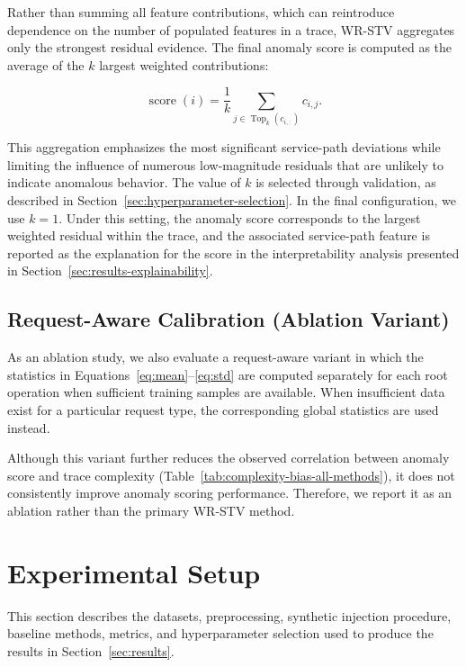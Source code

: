 \documentclass[informatics,article,submit,moreauthors]{Definitions/mdpi}
\newcommand{\rev}[1]{{\color{revisionblue}#1}}
\begin{document}
Rather than summing all feature contributions, which can reintroduce
dependence on the number of populated features in a trace, WR-STV
aggregates only the strongest residual evidence. The final anomaly score
is computed as the average of the \(k\) largest weighted contributions:

\begin{equation}
	\operatorname{score}(i)
	=
	\frac{1}{k}
	\sum_{j \in \operatorname{Top}_k(c_{i,:})}
	c_{i,j}.
	\label{eq:topk}
\end{equation}

\noindent This aggregation emphasizes the most significant service-path
deviations while limiting the influence of numerous low-magnitude
residuals that are unlikely to indicate anomalous behavior. The value of
\(k\) is selected through validation, as described in
Section~\ref{sec:hyperparameter-selection}. In the final configuration,
we use \(k=1\). Under this setting, the anomaly score corresponds to the
largest weighted residual within the trace, and the associated
service-path feature is reported as the explanation for the score in the
interpretability analysis presented in
Section~\ref{sec:results-explainability}.

\subsection{Request-Aware Calibration (Ablation Variant)}

As an ablation study, we also evaluate a request-aware variant in which
the statistics in Equations~\ref{eq:mean}--\ref{eq:std} are computed
separately for each root operation when sufficient training samples are
available. When insufficient data exist for a particular request type,
the corresponding global statistics are used instead.

Although this variant further reduces the observed correlation between
anomaly score and trace complexity (Table~\ref{tab:complexity-bias-all-methods}), it does not consistently improve
anomaly scoring performance. Therefore, we report it as an ablation
rather than the primary WR-STV method.


\section{Experimental Setup}
\label{sec:experimental-setup}

\rev{This section describes the datasets, preprocessing, synthetic
injection procedure, baseline methods, metrics, and hyperparameter
selection used to produce the results in
Section~\ref{sec:results}.}
\end{document}
